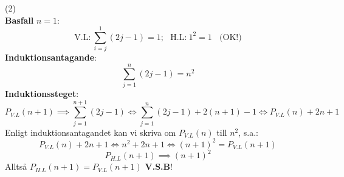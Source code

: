 \documentclass{report}
\begin{document}
\sol (2)\\
\textbf{Basfall} $n=1$:
\begin{equation*}
\text{V.L:}\:\sum_{i=j}^{1} (2j-1) = 1;\:\:\:\text{H.L:}\: 1^2 = 1\:\:\:\:\text{(OK!)}
\end{equation*}
\textbf{Induktionsantagande}:
\begin{equation*}
\sum_{j=1}^{n} (2j-1)= n^2
\end{equation*}
\textbf{Induktionssteget}:
\begin{equation*}
P_{V.L}(n+1) \implies \sum_{j=1}^{n+1}(2j-1) \iff \sum_{j=1}^{n}(2j-1) + 2(n+1)-1 \iff P_{V.L}(n) + 2n+1
\end{equation*}
Enligt induktionsantagandet kan vi skriva om $P_{V.L}(n)$ till $n^2$, s.a.:
\begin{equation*}
P_{V.L}(n) + 2n+1 \iff n^2 + 2n + 1 \iff (n+1)^2 = P_{V.L}(n+1)
\end{equation*}
\begin{equation*}
P_{H.L}(n+1) \implies (n+1)^2
\end{equation*}
Alltså $P_{H.L}(n+1) = P_{V.L}(n+1)$ \textbf{V.S.B}!
\end{document}
